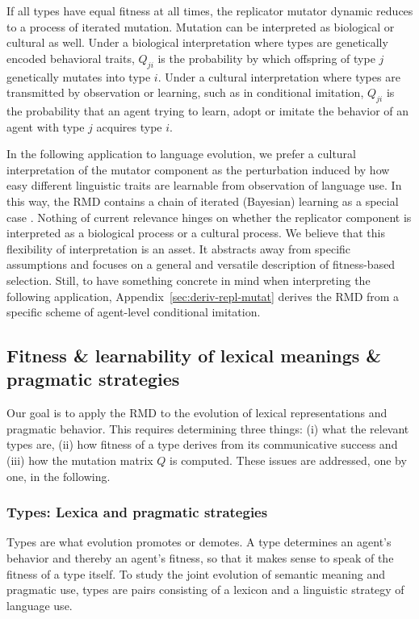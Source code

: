 \documentclass[a4paper, 11pt]{article}
\theoremstyle{Satz}
\begin{document}
If all types have equal fitness at all times, the replicator mutator dynamic reduces to a
process of iterated mutation. Mutation can be interpreted as biological or cultural as
well. Under a biological interpretation where types are genetically encoded behavioral traits,
$Q_{ji}$ is the probability by which offspring of type $j$ genetically mutates into type
$i$. Under a cultural interpretation where types are transmitted by observation or learning,
such as in conditional imitation, $Q_{ji}$ is the probability that an agent trying to learn,
adopt or imitate the behavior of an agent with type $j$ acquires type $i$.

In the following application to language evolution, we prefer a cultural interpretation of the
mutator component as the perturbation induced by how easy different linguistic traits are
learnable from observation of language use. In this way, the RMD contains a chain of iterated
(Bayesian) learning as a special case
\citep{griffiths+kalish:2005,griffiths+kalish:2007}. Nothing of current relevance hinges on
whether the replicator component is interpreted as a biological process or a cultural
process. We believe that this flexibility of interpretation is an asset. It abstracts away from
specific assumptions and focuses on a general and versatile description of fitness-based
selection. Still, to have something concrete in mind when interpreting the following
application, Appendix~\ref{sec:deriv-repl-mutat} derives the RMD from a specific scheme of
agent-level conditional imitation.


\subsection{Fitness \& learnability of lexical meanings \& pragmatic strategies}
\label{sec:fitn--learn}


Our goal is to apply the RMD to the evolution of lexical representations and pragmatic
behavior. This requires determining three things: (i) what the relevant types are, (ii) how
fitness of a type derives from its communicative success and (iii) how the mutation matrix $Q$
is computed. These issues are addressed, one by one, in the following.

\subsubsection{Types: Lexica and pragmatic strategies}
\label{sec:languages+use}
Types are what evolution promotes or demotes. A type determines an agent's behavior and thereby
an agent's fitness, so that it makes sense to speak of the fitness of a type itself. To study
the joint evolution of semantic meaning and pragmatic use, types are pairs consisting of a
lexicon and a linguistic strategy of language use.
\end{document}
